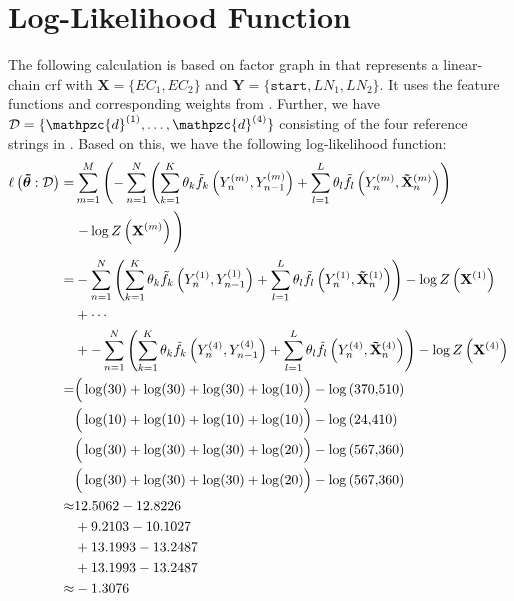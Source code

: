 \newpage

\section{Log-Likelihood Function}\label{app:sec-log-likelihood-function}
The following calculation is based on \gls{factor graph} in  that represents a \gls{linear-chain crf} with $\mathbf{X}=\{EC_1,EC_2\}$ and $\mathbf{Y}=\{\texttt{start},LN_1,LN_2\}$.
It uses the \glspl{feature function} and corresponding weights from .
Further, we have $\mathcal{D}=\{\mathpzc{d}^{(1)},\dots,\mathpzc{d}^{(4)}\}$ consisting of the four reference strings in .
Based on this, we have the following log-likelihood function:
\begin{equation*}
  \begin{split}
    \ell\left(\bm{\tilde{\theta}}:\mathcal{D}\right) = & \sum_{m=1}^M \left(-\sum_{n=1}^N \left(\sum_{k=1}^K\theta_k \tilde{f}_k\left(Y_n^{(m)},Y_{n-1}^{(m)}\right)+\sum_{l=1}^L\theta_l \tilde{f}_l\left(Y_n^{(m)},\mathbf{\tilde{X}}_n^{(m)}\right)\right)\right. \\
    &\left.-\log Z\left(\mathbf{X}^{(m)}\right)\vphantom{\sum_{l=1}^L}\right)\\
    =&-\sum_{n=1}^N \left(\sum_{k=1}^K\theta_k \tilde{f}_k\left(Y_n^{(1)},Y_{n-1}^{(1)}\right)+\sum_{l=1}^L\theta_l \tilde{f}_l\left(Y_n^{(1)},\mathbf{\tilde{X}}_n^{(1)}\right)\right)-\log Z\left(\mathbf{X}^{(1)}\right)\vphantom{\sum_{l=1}^L}\\
    &+\cdots\\
    &+-\sum_{n=1}^N \left(\sum_{k=1}^K\theta_k \tilde{f}_k\left(Y_n^{(4)},Y_{n-1}^{(4)}\right)+\sum_{l=1}^L\theta_l \tilde{f}_l\left(Y_n^{(4)},\mathbf{\tilde{X}}_n^{(4)}\right)\right)-\log Z\left(\mathbf{X}^{(4)}\right)\vphantom{\sum_{l=1}^L}\\
    =&\Big(\log(30)+\log(30)+\log(30)+\log(10)\Big)-\log\left(\num{370510}\right)\\
    &\Big(\log(10)+\log(10)+\log(10)+\log(10)\Big)-\log\left(\num{24410}\right)\\
    &\Big(\log(30)+\log(30)+\log(30)+\log(20)\Big)-\log\left(\num{567360}\right)\\
    &\Big(\log(30)+\log(30)+\log(30)+\log(20)\Big)-\log\left(\num{567360}\right)\\
    \approx&12.5062-12.8226\\
    &+9.2103-10.1027\\
    &+13.1993-13.2487\\
    &+13.1993-13.2487\\
    \approx&-1.3076
 \end{split}
\end{equation*}
